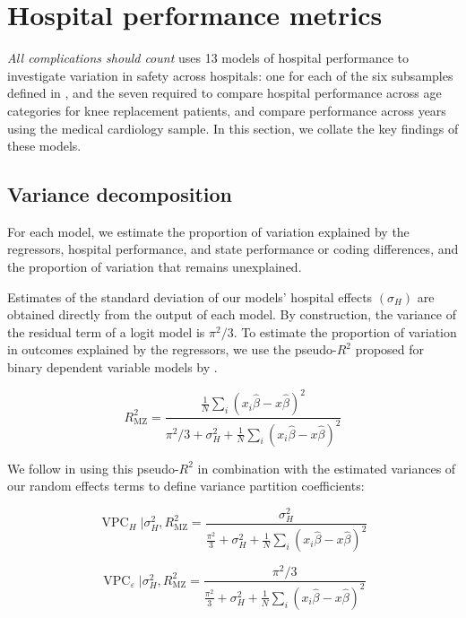 \documentclass[submission]{grattan}
\newcommand*{\myTitle}{All complications should count}
\begin{document}
\section{Hospital performance metrics}\label{sec:hospital-performance-metrics}

\textit{\myTitle} uses 13 models of hospital performance to investigate variation in safety across hospitals: one for each of the six subsamples defined in , and the seven required to compare hospital performance across age categories for knee replacement patients, and compare performance across years using the medical cardiology sample.
In this section, we collate the key findings of these models.

\subsection{Variance decomposition}\label{subsec:variance-decomposition}

For each model, we estimate the proportion of variation explained by the regressors, hospital performance, and state performance or coding differences, and the proportion of variation that remains unexplained.

Estimates of the standard deviation of our models' hospital effects \((\sigma_{H})\) are obtained directly from the output of each model.
By construction, the variance of the residual term of a logit model is \(\pi^2/3\).
To estimate the proportion of variation in outcomes explained by the regressors, we use the pseudo-\(R^2\) proposed for binary dependent variable models by \textcite{McKelvey_1975}.

\[R_{\text{MZ}}^{2} = \frac{\frac{1}{N}\sum_{i} (x_{i}\hat{\beta} - x\hat{\beta})^{2}}{\pi^2/3 + \sigma_{H}^{2} + \frac{1}{N}\sum_{i}^{}(x_{i}\hat{\beta} - x\hat{\beta})^2}\]

We follow \textcite{zhang2013patient} in using this pseudo-\(R^2\) in combination with the estimated variances of our random effects terms to define variance partition coefficients:

\[\operatorname{VPC}_{H}|\sigma_{H}^{2},R_{\text{MZ}}^{2} = \frac{\sigma_{H}^{2}}{\frac{\pi^2}{3} + \sigma_{H}^{2} + \frac{1}{N}\sum_{i}( x_{i}\hat{\beta} - {x}\hat{\beta})^{2}}\]

\[\operatorname{VPC}_{\varepsilon}|\sigma_{H}^{2},R_{\text{MZ}}^{2} = \frac{\pi^2/3}{\frac{\pi^2}{3} + \sigma_{H}^{2} + \frac{1}{N}\sum_i (x_{i}\hat{\beta} - x\hat{\beta})^2} \]
\end{document}
